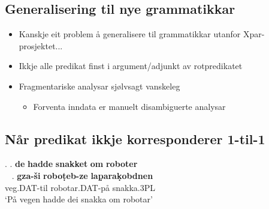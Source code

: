 \documentclass[xcolor=x11names,compress,bigger]{beamer}
\renewcommand{\(}{\begin{columns}}
\renewcommand{\)}{\end{columns}}
\newcommand{\<}[1]{\begin{column}{#1}}
\renewcommand{\>}{\end{column}}
\begin{document}
\subsection{Generalisering til nye grammatikkar}
\begin{frame}
  \begin{itemize}
  \item Kanskje eit problem å generalisere til grammatikkar utanfor Xpar-prosjektet...
  \item Ikkje alle predikat finst i argument/adjunkt av rotpredikatet
  \item Fragmentariske analysar sjølvsagt vanskeleg
    \begin{itemize}
    \item Forventa inndata er manuelt disambiguerte analysar
    \end{itemize}
  \end{itemize}
\end{frame}


\subsection{Når predikat ikkje korresponderer 1-til-1}
\begin{frame}
    {\footnotesize\setlength{\Exlabelsep}{1.0em} %
    \alignSubExtrue %
    \ex. \a.  \textbf{de} \textbf{hadde} \textbf{snakket} \textbf{om} \textbf{roboter}\\~
    \bg. \textbf{gza-\v{s}i} \textbf{robo\d{t}eb-ze} \textbf{la\d{p}ara\d{k}obdnen} \\
    veg.DAT-til robotar.DAT-på snakka.3PL \\
    `På vegen hadde dei snakka om robotar'

  }
\end{frame}
\end{document}
